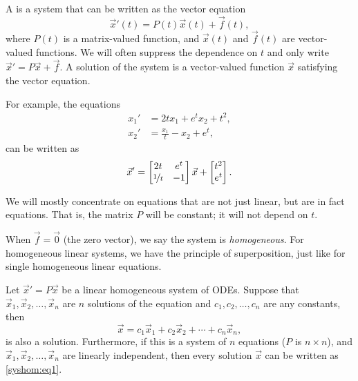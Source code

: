 A \emph{} is a system that can be
written as the vector equation
\begin{equation*}
{\vec{x}}'(t) = P(t)\vec{x}(t) + \vec{f}(t),
\end{equation*}
where $P(t)$ is a matrix-valued function,
and $\vec{x}(t)$ and $\vec{f}(t)$ are vector-valued functions.
We will often suppress the dependence on $t$ and
only write ${\vec{x}}' = P\vec{x} + \vec{f}$.  A solution of
the system is a vector-valued function
$\vec{x}$ satisfying the vector equation.

For example, the equations
\begin{equation*}
\begin{aligned}
x_1' &= 2t x_1 + e^t x_2 + t^2 , \\
x_2' &= \frac{x_1}{t} -x_2 + e^t ,
\end{aligned}
\end{equation*}
can be written as
\begin{equation*}
{\vec{x}}' = 
\begin{bmatrix}
2t & e^t \\
\nicefrac{1}{t} & -1
\end{bmatrix}
\vec{x}
+
\begin{bmatrix}
t^2 \\
e^t
\end{bmatrix} .
\end{equation*}

We will mostly concentrate on equations that are not just linear, but are in
fact \emph{} equations.  That is, the matrix $P$ will
be constant; it will not depend on $t$.

\medskip

When $\vec{f} = \vec{0}$ (the zero vector), we say the system is
\emph{homogeneous}.
For homogeneous linear systems, we have the
principle of superposition, just like for single homogeneous linear equations.

\begin{theorem}[Superposition]
Let
${\vec{x}}' = P\vec{x}$ be a linear homogeneous system of ODEs.  Suppose
that $\vec{x}_1,\vec{x}_2,\ldots,\vec{x}_n$ are $n$ solutions of the equation
and $c_1,c_2,\ldots,c_n$ are any constants, then
\begin{equation} \label{syshom:eq1}
\vec{x} = c_1 \vec{x}_1 + c_2 \vec{x}_2 + \cdots + c_n \vec{x}_n ,
\end{equation}
is also a solution.
Furthermore, if this is a system of $n$ equations ($P$ is $n\times n$), and
$\vec{x}_1,\vec{x}_2,\ldots,\vec{x}_n$ are linearly independent, then every
solution  $\vec{x}$ can be written as \eqref{syshom:eq1}.
\end{theorem}

